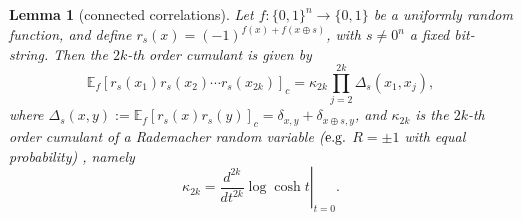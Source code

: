 \documentclass[aps,pra,superscriptaddress,twocolumn,longbibliography]{revtex4-2}
\newtheorem{lemma}{\textbf{Lemma}}
\begin{document}
\begin{lemma}[connected correlations]
\label{app_lemma:connected_redemacher}
Let \(f:\{0,1\}^{n}\to \{0,1\}\) be a uniformly random function, and define $r_s(x)=(-1)^{f(x)+f(x\oplus s)}$, with \(s\neq 0^n\) a fixed bit-string. Then the \(2k\)-th order cumulant is given by
%
\begin{equation}
    \mathbb{E}_{f}
    \left[
        r_s(x_1)r_s(x_2)\cdots r_s(x_{2k})
    \right]_{c}
    =
    \kappa_{2k}
    \prod_{j=2}^{2k}\Delta_s(x_1,x_j),
\end{equation}
%
where $\Delta_s(x,y):= \mathbb{E}_{f}\left[r_s(x)r_s(y)\right]_{c} = \delta_{x,y}+\delta_{x\oplus s,y}$, and \(\kappa_{2k}\) is the \(2k\)-th order cumulant of a Rademacher random variable (${\rm e.g.}$ \(R=\pm 1\) with equal probability) , namely
\[
    \kappa_{2k}
    =
    \left.
    \frac{d^{2k}}{dt^{2k}}\log\cosh t
    \right|_{t=0}.
\]
\end{lemma}
\end{document}

